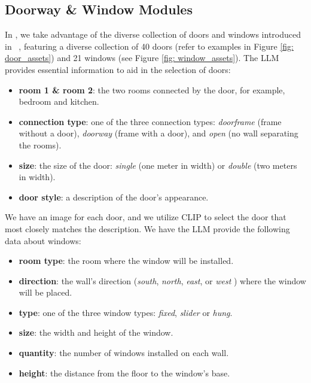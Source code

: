 \subsection{Doorway \& Window Modules}
In \holodeck, we take advantage of the diverse collection of doors and windows introduced in \procthor~\cite{procthor}, featuring a diverse collection of 40 doors (refer to examples in Figure \ref{fig: door_assets}) and 21 windows (see Figure \ref{fig: window_assets}). The LLM provides essential information to aid in the selection of doors:
\begin{itemize}
    \item \textbf{room 1 \& room 2}: the two rooms connected by the door, for example, bedroom and kitchen.
    \item \textbf{connection type}: one of the three connection types: \textit{doorframe} (frame without a door), \textit{doorway} (frame with a door), and \textit{open} (no wall separating the rooms).
    \item \textbf{size}: the size of the door: \textit{single} (one meter in width) or \textit{double} (two meters in width).
    \item \textbf{door style}: a description of the door's appearance.
\end{itemize}

\noindent We have an image for each door, and we utilize CLIP to select the door that most closely matches the description.
\smallbreak
\noindent We have the LLM provide the following data about windows:
\begin{itemize}
    \item \textbf{room type}: the room where the window will be installed.
    \item \textbf{direction}: the wall's direction (\textit{south}, \textit{north}, \textit{east}, or \textit{west} ) where the window will be placed.
    \item \textbf{type}: one of the three window types: \textit{fixed}, \textit{slider} or \textit{hung}.
    \item \textbf{size}: the width and height of the window.
    \item \textbf{quantity}: the number of windows installed on each wall.
    \item \textbf{height}: the distance from the floor to the window's base.
\end{itemize}

